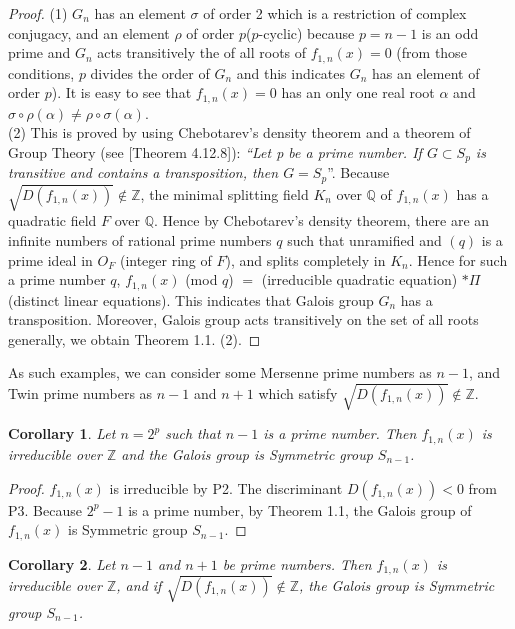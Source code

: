 \documentclass{article}
\newtheorem{coro}{Corollary}[section]
\begin{document}
\begin{proof}
(1) $G_{n}$ has an element $\sigma$ of order 2 which is a restriction of complex conjugacy, and an element $\rho$ of order $p$($p$-cyclic) because $p = n-1$ is an odd prime and $G_{n}$ acts transitively the of all roots of $f_{1,n}(x) = 0$ (from those conditions, $p$ divides the order of $G_{n}$ and this indicates $G_{n}$ has an element of order $p$). It is easy to see that $f_{1,n}(x) = 0$ has an only one real root $\alpha$ and $\sigma \circ \rho (\alpha) \neq \rho \circ \sigma (\alpha)$.
\\

(2) This is proved by using Chebotarev's density theorem and a theorem of Group Theory (see \cite{Fernando} [Theorem 4.12.8]): {\it``Let p be a prime number. If $G\subset S_{p}$ is transitive and contains a transposition, then $G=S_{p}$}''. Because $\sqrt{D(f_{1,n}(x))}\notin\mathbb{Z}$, the minimal splitting field $K_{n}$ over $\mathbb{Q}$ of $f_{1,n}(x)$ has a quadratic field $F$ over $\mathbb{Q}$. Hence by Chebotarev's density theorem, there are an infinite numbers of rational prime numbers $q$ such that unramified and $(q)$ is a prime ideal in $O_{F}$ (integer ring of $F$), and splits completely in $K_{n}$. Hence for such a prime number $q$, $f_{1,n}(x)$ (mod $q$) $=$ (irreducible quadratic equation) $\ast \Pi$ (distinct linear equations). This indicates that Galois group $G_{n}$ has a transposition. Moreover, Galois group acts transitively on the set of all roots generally, we obtain Theorem 1.1. (2).
\end{proof}

As such examples, we can consider some Mersenne prime numbers as $n-1$, and Twin prime numbers as $n-1$ and $n+1$ which satisfy $\sqrt{D(f_{1,n}(x))}\notin\mathbb{Z}$.

\begin{coro}
\upshape
Let $n=2^{p}$ such that $n-1$ is a prime number. Then $f_{1,n}(x)$ is irreducible over $\mathbb{Z}$ and the Galois group is Symmetric group $S_{n-1}$.
\end{coro}

\begin{proof}
$f_{1,n}(x)$ is irreducible by P2. The discriminant $D(f_{1,n}(x))<0$ from P3. Because $2^{p}-1$ is a prime number, by Theorem 1.1, the Galois group of $f_{1,n}(x)$ is Symmetric group $S_{n-1}$.
\end{proof}

\begin{coro}
\upshape
Let $n-1$ and $n+1$ be prime numbers. Then $f_{1,n}(x)$ is irreducible over $\mathbb{Z}$, and if $\sqrt{D(f_{1,n}(x))}\notin\mathbb{Z}$, the Galois group is Symmetric group $S_{n-1}$.
\end{coro}
\end{document}
